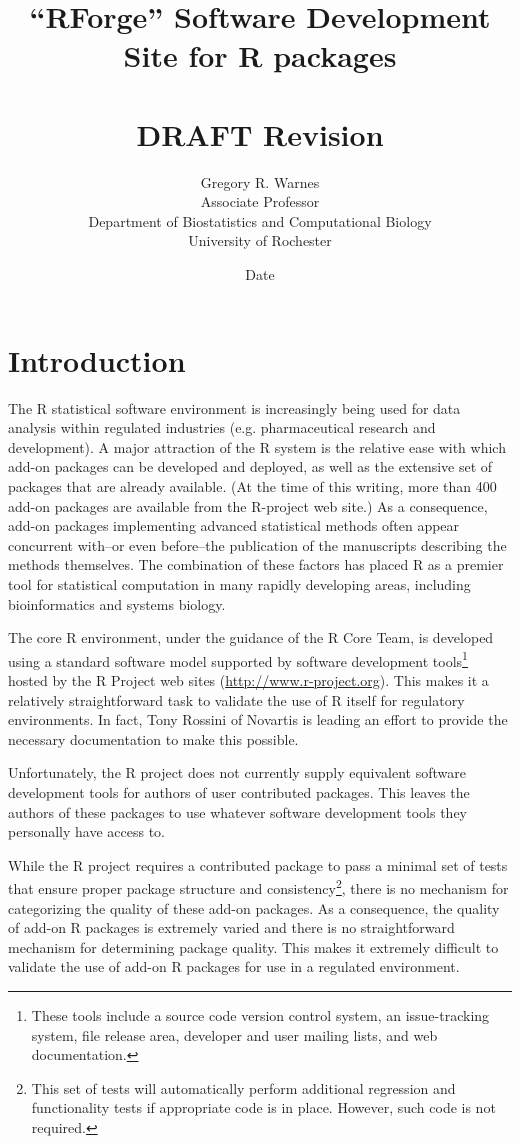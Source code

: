 \documentclass[12pt]{article}
\title{``RForge'' Software Development Site for R packages\\
	~ \\
       \textbf{DRAFT} $ $Revision$ $ }
\date{ $ $Date$ $ }
\author{Gregory R. Warnes\\
  Associate Professor\\
  Department of Biostatistics and Computational Biology \\
  University of Rochester}
\begin{document}
\maketitle

\section{Introduction}

The R statistical software environment is increasingly being used
for data analysis within regulated industries (e.g. pharmaceutical
research and development).  A major attraction of the R system is
the relative ease with which add-on packages can be developed and
deployed, as well as the extensive set of packages that are
already available.  (At the time of this writing, more than 400
add-on packages are available from the R-project web site.)  As a
consequence, add-on packages implementing advanced statistical
methods often appear concurrent with--or even before--the
publication of the manuscripts describing the methods themselves.
The combination of these factors has placed R as a premier tool
for statistical computation in many rapidly developing areas,
including bioinformatics and systems biology.

The core R environment, under the guidance of the R Core Team, is
developed using a standard software model supported by software
development tools\footnote{These tools include a source code version
  control system, an issue-tracking system, file release area,
  developer and user mailing lists, and web documentation.}  hosted by
the R Project web sites (\url{http://www.r-project.org}).  This makes it a
relatively straightforward task to validate the use of R itself
for regulatory environments.  In fact, Tony Rossini of Novartis is
leading an effort to provide the necessary documentation to make this
possible.

Unfortunately, the R project does not currently supply equivalent
software development tools for authors of user contributed packages.
This leaves the authors of these packages to use whatever software
development tools they personally have access to.

While the R project requires a contributed package to pass a minimal
set of tests that ensure proper package structure and
consistency\footnote{This set of tests will automatically perform
  additional regression and functionality tests if appropriate code is
  in place.  However, such code is not required.}, there is no
mechanism for categorizing the quality of these add-on packages.  As a
consequence, the quality of add-on R packages is extremely varied and
there is no straightforward mechanism for determining package quality.
This makes it extremely difficult to validate the use of add-on R
packages for use in a regulated environment.
\end{document}
